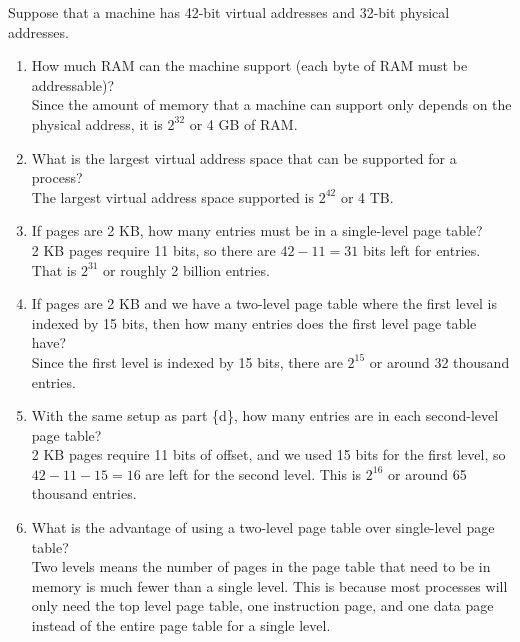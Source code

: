 \documentclass[12pt]{article}
\newenvironment{problem}[2][Problem]{\begin{trivlist}
\item[\hskip \labelsep {\bfseries #1}\hskip \labelsep {\bfseries #2.}]}{\end{trivlist}}
\begin{document}
\pagebreak
\begin{problem}{2}
Suppose that a machine has 42-bit virtual addresses and 32-bit physical
addresses.
\begin{enumerate}[label=\{\alph*\}]
    \item How much RAM can the machine support (each byte of RAM must be addressable)?\\
    Since the amount of memory that a machine can support only depends on the physical address, it is $2^{32}$ or 4 GB of RAM.
    \item What is the largest virtual address space that can be supported for a process?\\
    The largest virtual address space supported is $2^{42}$ or 4 TB. 
    \item If pages are 2 KB, how many entries must be in a single-level page table?\\
    2 KB pages require 11 bits, so there are $42 - 11 = 31$ bits left for entries. That is $2^{31}$ or roughly 2 billion entries.
    \item If pages are 2 KB and we have a two-level page table where the first level is indexed by 15 bits, 
    then how many entries does the first level page table have?\\
    Since the first level is indexed by 15 bits, there are $2^{15}$ or around 32 thousand entries.
    \item With the same setup as part \{d\}, how many entries are in each second-level page table?\\
    2 KB pages require 11 bits of offset, and we used 15 bits for the first level, 
    so $42-11-15=16$ are left for the second level. This is $2^{16}$ or around 65 thousand entries.
    \item What is the advantage of using a two-level page table over single-level page table?\\
    Two levels means the number of pages in the page table that need to be in memory is much fewer than a single level.
    This is because most processes will only need the top level page table, one instruction page, and one data page 
    instead of the entire page table for a single level.
\end{enumerate}
\end{problem}
\pagebreak
\end{document}

